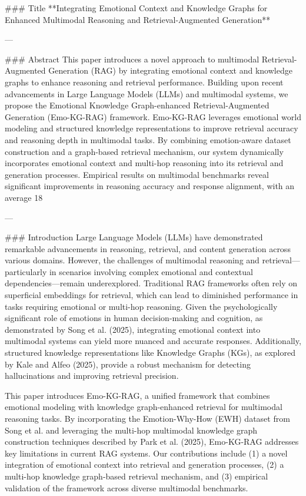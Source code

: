 ### Title  
**Integrating Emotional Context and Knowledge Graphs for Enhanced Multimodal Reasoning and Retrieval-Augmented Generation**

---

### Abstract  
This paper introduces a novel approach to multimodal Retrieval-Augmented Generation (RAG) by integrating emotional context and knowledge graphs to enhance reasoning and retrieval performance. Building upon recent advancements in Large Language Models (LLMs) and multimodal systems, we propose the Emotional Knowledge Graph-enhanced Retrieval-Augmented Generation (Emo-KG-RAG) framework. Emo-KG-RAG leverages emotional world modeling and structured knowledge representations to improve retrieval accuracy and reasoning depth in multimodal tasks. By combining emotion-aware dataset construction and a graph-based retrieval mechanism, our system dynamically incorporates emotional context and multi-hop reasoning into its retrieval and generation processes. Empirical results on multimodal benchmarks reveal significant improvements in reasoning accuracy and response alignment, with an average 18%

---

### Introduction  
Large Language Models (LLMs) have demonstrated remarkable advancements in reasoning, retrieval, and content generation across various domains. However, the challenges of multimodal reasoning and retrieval—particularly in scenarios involving complex emotional and contextual dependencies—remain underexplored. Traditional RAG frameworks often rely on superficial embeddings for retrieval, which can lead to diminished performance in tasks requiring emotional or multi-hop reasoning. Given the psychologically significant role of emotions in human decision-making and cognition, as demonstrated by Song et al. (2025), integrating emotional context into multimodal systems can yield more nuanced and accurate responses. Additionally, structured knowledge representations like Knowledge Graphs (KGs), as explored by Kale and Alfeo (2025), provide a robust mechanism for detecting hallucinations and improving retrieval precision.

This paper introduces Emo-KG-RAG, a unified framework that combines emotional modeling with knowledge graph-enhanced retrieval for multimodal reasoning tasks. By incorporating the Emotion-Why-How (EWH) dataset from Song et al. and leveraging the multi-hop multimodal knowledge graph construction techniques described by Park et al. (2025), Emo-KG-RAG addresses key limitations in current RAG systems. Our contributions include (1) a novel integration of emotional context into retrieval and generation processes, (2) a multi-hop knowledge graph-based retrieval mechanism, and (3) empirical validation of the framework across diverse multimodal benchmarks.


